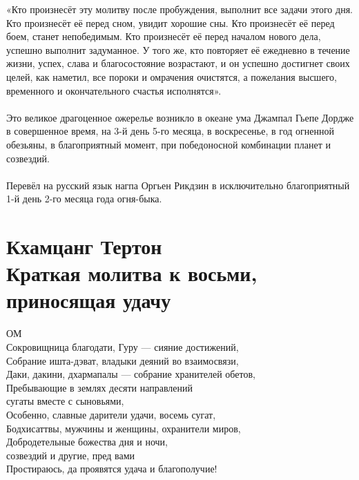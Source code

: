 «Кто произнесёт эту молитву после пробуждения, выполнит все задачи этого дня.
Кто произнесёт её перед сном, увидит хорошие сны.
Кто произнесёт её перед боем, станет непобедимым.
Кто произнесёт её перед началом нового дела, успешно выполнит задуманное.
У того же, кто повторяет её ежедневно в течение жизни, успех,
слава и благосостояние возрастают, и он успешно достигнет
своих целей, как наметил, все пороки и омрачения очистятся,
а пожелания высшего, временного и окончательного счастья исполнятся».\\
\\
Это великое драгоценное ожерелье возникло в океане ума
Джампал Гьепе Дордже в совершенное время, на 3-й день
5-го месяца, в воскресенье, в год огненной обезьяны,
в благоприятный момент, при победоносной комбинации планет и созвездий.\\
\\
Перевёл на русский язык нагпа Оргьен Рикдзин
в исключительно благоприятный 1-й день 2-го месяца года огня-быка.
\normalsize
\newpage
\section{Кхамцанг Тертон\\Краткая молитва к восьми, \\приносящая удачу}
ОМ\\
Сокровищница благодати, Гуру — сияние достижений,\\
Собрание ишта-дэват, владыки деяний во взаимосвязи,\\
Даки, дакини, дхармапалы — собрание хранителей обетов,\\
Пребывающие в землях десяти направлений \\ \indent сугаты вместе с сыновьями,\\
Особенно, славные дарители удачи, восемь сугат,\\
Бодхисаттвы, мужчины и женщины, охранители миров,\\
Добродетельные божества дня и ночи, \\ \indent созвездий и другие, пред вами\\
Простираюсь, да проявятся удача и благополучие!\\

